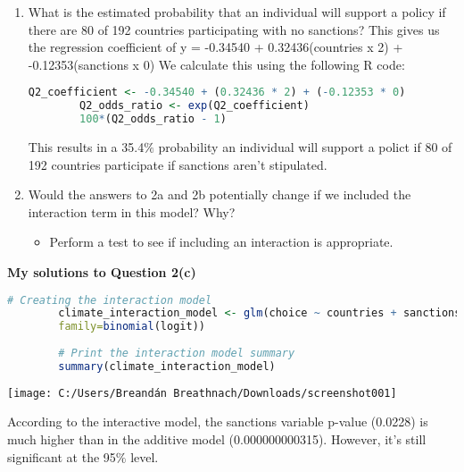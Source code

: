 \documentclass[12pt,letterpaper]{article}
\begin{document}
\begin{enumerate}
\begin{enumerate}
		This means for a one-unit increase - in this instance, sanctions increasing from 5$\%$ to 15$\%$ - the odds of the choice variable decrease by a factor of 0.884 or 11.6$\%$. 
		\vspace{.5cm}
		\item
		What is the estimated probability that an individual will support a policy if there are 80 of 192 countries participating with no sanctions? 
		\vspace{.35cm}
		This gives us the regression coefficient of y = -0.34540 + 0.32436(countries x 2) + -0.12353(sanctions x 0)
		\vspace{.35cm}
		We calculate this using the following R code:
		\begin{lstlisting}[language=R]
		Q2_coefficient <- -0.34540 + (0.32436 * 2) + (-0.12353 * 0) 
		Q2_odds_ratio <- exp(Q2_coefficient)
		100*(Q2_odds_ratio - 1)\end{lstlisting}
		\vspace{.35cm}
		This results in a 35.4$\%$ probability an individual will support a polict if 80 of 192 countries participate if sanctions aren't stipulated.
		\vspace{.5cm}
		\item
		Would the answers to 2a and 2b potentially change if we included the interaction term in this model? Why? 
		\begin{itemize}
			\item Perform a test to see if including an interaction is appropriate.
		\end{itemize}
	\end{enumerate}
	\vspace{.5cm}
	\textbf{My solutions to Question 2(c)}
	\vspace{.25cm}
	\begin{lstlisting}[language=R]
		# Creating the interaction model
		climate_interaction_model <- glm(choice ~ countries + sanctions + countries*sanctions, data = climateSupport, 
		family=binomial(logit))
		
		# Print the interaction model summary
		summary(climate_interaction_model) \end{lstlisting}
	\vspace{.5cm}
	\texttt{[image: C:/Users/Breandán Breathnach/Downloads/screenshot001]}
	\label{C:/Users/Breandán Breathnach/Downloads/screenshot003.png}
	\vspace{.5cm}
	
	According to the interactive model, the sanctions variable p-value (0.0228) is much higher than in the additive model (0.000000000315). However, it's still significant at the 95$\%$ level. 
	

\end{enumerate}
\end{document}
